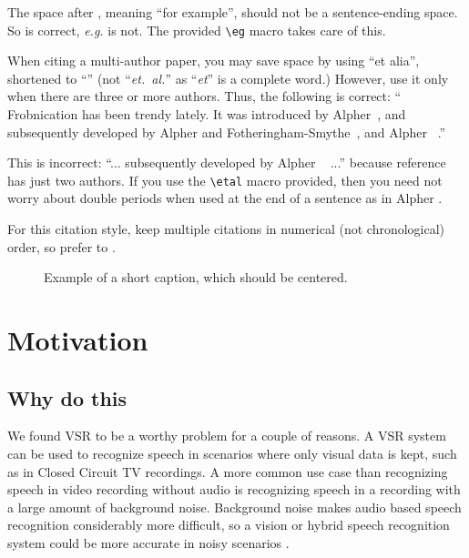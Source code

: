 \documentclass[10pt,twocolumn,letterpaper]{article}
\begin{document}
The space after \eg, meaning ``for example'', should not be a
sentence-ending space. So \eg is correct, {\em e.g.} is not.  The provided
\verb'\eg' macro takes care of this.

When citing a multi-author paper, you may save space by using ``et alia'',
shortened to ``\etal'' (not ``{\em et.\ al.}'' as ``{\em et}'' is a complete word.)
However, use it only when there are three or more authors.  Thus, the
following is correct: ``
   Frobnication has been trendy lately.
   It was introduced by Alpher~\cite{Dupont}, and subsequently developed by
   Alpher and Fotheringham-Smythe~\cite{Dupont}, and Alpher \etal~\cite{Dupont}.''

This is incorrect: ``... subsequently developed by Alpher \etal~\cite{Dupont} ...''
because reference~\cite{Dupont} has just two authors.  If you use the
\verb'\etal' macro provided, then you need not worry about double periods
when used at the end of a sentence as in Alpher \etal.

For this citation style, keep multiple citations in numerical (not
chronological) order, so prefer \cite{Dupont} to
\cite{Dupont}.


\begin{figure*}
\begin{center}
\fbox{\rule{0pt}{2in} \rule{.9\linewidth}{0pt}}
\end{center}
   \caption{Example of a short caption, which should be centered.}
\label{fig:short}
\end{figure*}

\section{Motivation}
\subsection{Why do this}
We found VSR to be a worthy problem for a couple of reasons.
A VSR system can be used to recognize speech in scenarios where only visual data is kept, such as in Closed Circuit TV recordings.
A more common use case than recognizing speech in video recording without audio is recognizing speech in a recording with a large amount of background noise.
Background noise makes audio based speech recognition considerably more difficult, so a vision or hybrid speech recognition system could be more accurate in noisy scenarios \cite{Dupont}.
\end{document}
